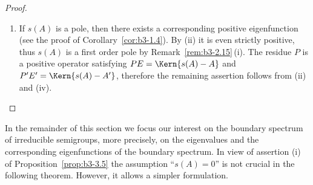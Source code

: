 \begin{proof}
\begin{enumerate}[\upshape (i), wide, labelindent=.25em]
	\item 
	If\/ $s(A)$ is a pole, then there exists a corresponding positive eigenfunction (see the proof of Corollary~\ref{cor:b3-1.4}).
	By (ii) it is even strictly positive, thus $s(A)$ is a first order pole by Remark~\ref{rem:b3-2.15}\,(i).
	The residue $P$ is a positive operator satisfying $PE = \Kern{s(A) - A}$ and $P'E' = \Kern{s(A) - A'}$, therefore the remaining assertion follows from (ii) and (iv).
	\end{enumerate}
	\end{proof}
In the remainder of this section we focus our interest on the boundary spectrum of irreducible semigroups, more precisely, on the eigenvalues and the corresponding eigenfunctions of the boundary spectrum. 
In view of assertion (i) of Proposition~\ref{prop:b3-3.5} the assumption \enquote{$s(A) = 0$} is not crucial in the following theorem. 
However, it allows a simpler formulation. 

